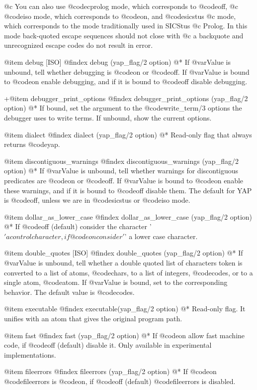 {{{{{{{@c You can also use @code{cprolog} mode, which corresponds to @code{off},
@c @code{iso} mode, which corresponds to @code{on}, and @code{sicstus}
@c mode, which corresponds to the mode traditionally used in SICStus
@c Prolog. In this mode back-quoted escape sequences should not close with
@c a backquote and unrecognized escape codes do not result in error.

@item debug [ISO]
@findex debug (yap_flag/2 option)
@*
If @var{Value} is unbound, tell whether debugging is @code{on} or
@code{off}. If @var{Value} is bound to @code{on} enable debugging, and if
it is bound to @code{off} disable debugging.

+@item debugger_print_options
@findex debugger_print_options (yap_flag/2 option)
@* 
If bound, set the argument to the @code{write_term/3} options the
debugger uses to write terms. If unbound, show the current options.

@item dialect
@findex dialect (yap_flag/2 option)
@*
Read-only flag that always returns @code{yap}.

@item discontiguous_warnings
@findex discontiguous_warnings (yap_flag/2 option)
@*
If @var{Value} is unbound, tell whether warnings for discontiguous
predicates are @code{on} or
@code{off}. If @var{Value} is bound to @code{on} enable these warnings,
and if it is bound to @code{off} disable them. The default for YAP is
@code{off}, unless we are in @code{sicstus} or @code{iso} mode.

@item  dollar_as_lower_case
@findex dollar_as_lower_case (yap_flag/2 option)
@*
If @code{off} (default)  consider the character '$' a control character, if
@code{on} consider '$' a lower case character.

@item double_quotes [ISO]
@findex double_quotes (yap_flag/2 option)
@*
If @var{Value} is unbound, tell whether a double quoted list of characters
token is converted to a list of atoms, @code{chars}, to a list of integers,
@code{codes}, or to a single atom, @code{atom}. If @var{Value} is bound, set to
the corresponding behavior. The default value is @code{codes}.

@item executable
@findex executable(yap_flag/2 option)
@* Read-only flag. It unifies with an atom that gives the
original program path.

@item  fast
@findex fast (yap_flag/2 option)
@*
If @code{on} allow fast machine code, if @code{off} (default) disable it. Only
available in experimental implementations.

@item  fileerrors
@findex fileerrors (yap_flag/2 option)
@*
If @code{on} @code{fileerrors} is @code{on}, if @code{off} (default)
@code{fileerrors} is disabled.

}}}}}}}
